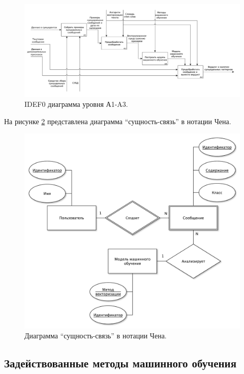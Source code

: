 \begin{figure}[H]
	\centering
	\includegraphics[width=\textwidth]{inc/A1.pdf}
	\caption{ IDEF0 диаграмма уровня А1-A3. }
	\label{img:idef1}
\end{figure}

На рисунке \ref{img:er} представлена диаграмма ``сущность-связь'' в нотации Чена.

\begin{figure}[H]
	\centering
	\includegraphics[width=\textwidth]{inc/er.pdf}
	\caption{ Диаграмма ``сущность-связь'' в нотации Чена. }
	\label{img:er}
\end{figure}

\subsection{Задействованные методы машинного обучения}


